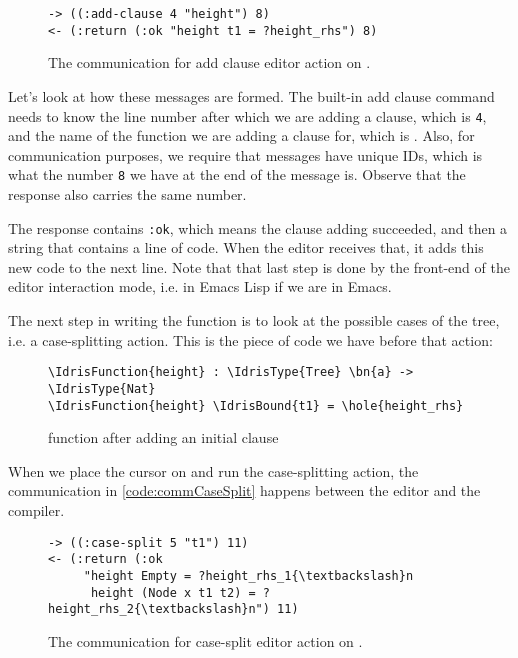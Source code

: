 \begin{figure}[H]
  \caption{The communication for add clause editor action on .}
  \label{code:commAddClause}
\begin{Verbatim}[framesep=2mm, label=\footnotesize{\normalfont{S-expression}}, labelposition=topline]
-> ((:add-clause 4 "height") 8)
<- (:return (:ok "height t1 = ?height_rhs") 8)
\end{Verbatim}
\end{figure}

Let's look at how these messages are formed. The built-in add clause command
needs to know the line number after which we are adding a clause, which is
\texttt{4}, and the name of the function we are adding a clause for, which is
.
Also, for communication purposes, we require that messages have unique IDs,
which is what the number \texttt{8} we have at the end of the message is.
Observe that the response also carries the same number.

The response contains \texttt{:ok}, which means the clause adding succeeded,
and then a string that contains a line of code.
When the editor receives that, it adds this new code to the next
line. Note that that last step is done by the front-end of the editor
interaction mode, i.e. in Emacs Lisp if we are in Emacs.

The next step in writing the function  is to look at the possible
cases of the tree, i.e. a case-splitting action. This is the piece of code we
have before that action:

\begin{figure}[H]
  \caption{ function after adding an initial clause}
\begin{Verbatim}[framesep=2mm, label=\footnotesize{\normalfont{Idris}}, labelposition=topline]
\IdrisFunction{height} : \IdrisType{Tree} \bn{a} -> \IdrisType{Nat}
\IdrisFunction{height} \IdrisBound{t1} = \hole{height_rhs}
\end{Verbatim}
\end{figure}

\noindent When we place the cursor on  and run the case-splitting action, the
communication in \autoref{code:commCaseSplit} happens between the editor and
the compiler.

\begin{figure}[H]
\caption{The communication for case-split editor action on .}
\label{code:commCaseSplit}
\begin{Verbatim}[framesep=2mm, label=\footnotesize{\normalfont{S-expression}}, labelposition=topline]
-> ((:case-split 5 "t1") 11)
<- (:return (:ok
     "height Empty = ?height_rhs_1{\textbackslash}n
      height (Node x t1 t2) = ?height_rhs_2{\textbackslash}n") 11)
\end{Verbatim}
\end{figure}

